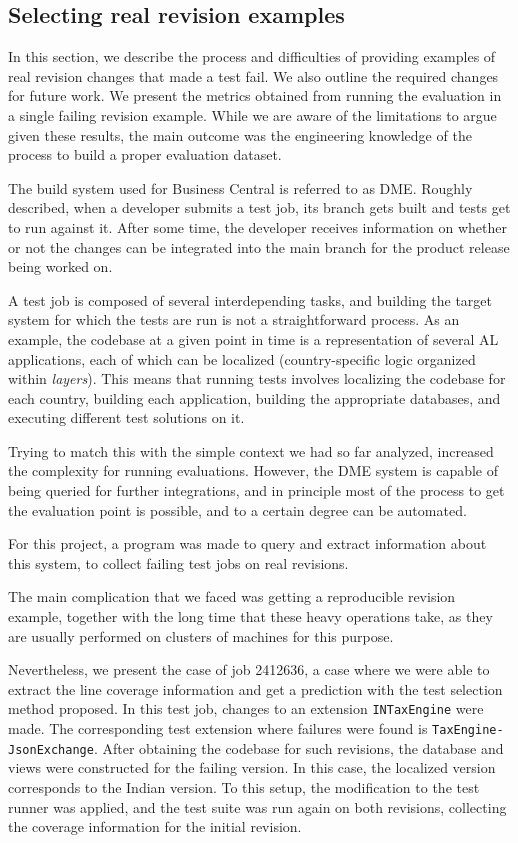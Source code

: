 \documentclass{article}
\begin{document}
\subsection{Selecting real revision examples}\label{section:evaluation-real}
In this section, we describe the process and difficulties of providing examples of real revision changes that made a test fail. We also outline the required changes for future work. We present the metrics obtained from running the evaluation in a single failing revision example. While we are aware of the limitations to argue given these results, the main outcome was the engineering knowledge of the process to build a proper evaluation dataset.

The build system used for Business Central is referred to as DME. Roughly described, when a developer submits a test job, its branch gets built and tests get to run against it. After some time, the developer receives information on whether or not the changes can be integrated into the main branch for the product release being worked on.

A test job is composed of several interdepending tasks, and building the target system for which the tests are run is not a straightforward process. As an example, the codebase at a given point in time is a representation of several AL applications, each of which can be localized (country-specific logic organized within \emph{layers}). This means that running tests involves localizing the codebase for each country, building each application, building the appropriate databases, and executing different test solutions on it.

Trying to match this with the simple context we had so far analyzed, increased the complexity for running evaluations. However, the DME system is capable of being queried for further integrations, and in principle most of the process to get the evaluation point is possible, and to a certain degree can be automated.

For this project, a program was made to query and extract information about this system, to collect failing test jobs on real revisions.

The main complication that we faced was getting a reproducible revision example, together with the long time that these heavy operations take, as they are usually performed on clusters of machines for this purpose.

Nevertheless, we present the case of job 2412636, a case where we were able to extract the line coverage information and get a prediction with the test selection method proposed. In this test job, changes to an extension \texttt{INTaxEngine} were made. The corresponding test extension where failures were found is \texttt{TaxEngine-JsonExchange}. After obtaining the codebase for such revisions, the database and views were constructed for the failing version. In this case, the localized version corresponds to the Indian version. To this setup, the modification to the test runner was applied, and the test suite was run again on both revisions, collecting the coverage information for the initial revision.
\end{document}
